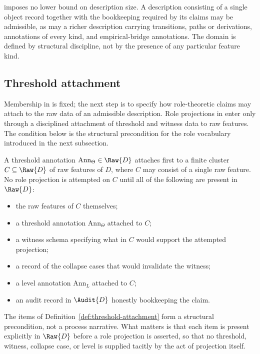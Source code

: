 \begin{remark}\label{rem:fatcd-minimality}
\FATCD{} imposes no lower bound on description size. A description
consisting of a single object record together with the bookkeeping
required by its claims may be admissible, as may a richer description
carrying transitions, paths or derivations, annotations of every kind,
and empirical-bridge annotations. The domain is defined by structural
discipline, not by the presence of any particular feature kind.
\end{remark}

\subsection{Threshold attachment}\label{subsec:threshold-attachment}

Membership in \FATCD{} is fixed; the next step is to specify how
role-theoretic claims may attach to the raw data of an admissible
description. Role projections in \FATCD{} enter only through a
disciplined attachment of threshold and witness data to raw features.
The condition below is the structural precondition for the role
vocabulary introduced in the next subsection.

\begin{definition}\label{def:threshold-attachment}
A threshold annotation \(\mathrm{Ann}_\Theta \in \Raw{D}\) attaches first to
a finite cluster \(C \subseteq \Raw{D}\) of raw features of \(D\), where \(C\)
may consist of a single raw feature. No role projection is attempted on \(C\)
until all of the following are present in \(\Raw{D}\):
\begin{itemize}[topsep=2pt,itemsep=1pt]
  \item the raw features of \(C\) themselves;
  \item a threshold annotation \(\mathrm{Ann}_\Theta\) attached to \(C\);
  \item a witness schema specifying what in \(C\) would support the attempted
    projection;
  \item a record of the collapse cases that would invalidate the witness;
  \item a level annotation \(\mathrm{Ann}_L\) attached to \(C\);
  \item an audit record in \(\Audit{D}\) honestly bookkeeping the claim.
\end{itemize}
\end{definition}

\begin{remark}\label{rem:pre-projection}
The items of Definition~\ref{def:threshold-attachment} form a structural
precondition, not a process narrative. What matters is that each item is
present explicitly in \(\Raw{D}\) before a role projection is asserted, so
that no threshold, witness, collapse case, or level is supplied tacitly by
the act of projection itself.
\end{remark}

